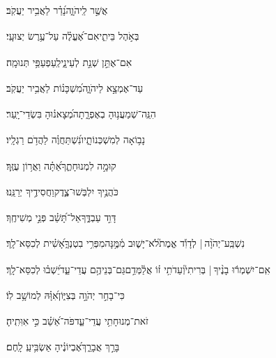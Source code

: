 \documentclass[12pt]{article}
\newcommand{\loc}[1]{\textsuperscript{\locf{#1}}}
\begin{document}
{\loc{ ב}~}‏אֲשֶׁ֣ר  לַֽיהֹוָ֑ה{\hfill}נָ֝דַ֗ר לַאֲבִ֥יר יַעֲקֹֽב׃\par

{\loc{ ג}~}‏ בְּאֹ֣הֶל בֵּיתִ֑י{\hfill}אִם־אֶ֝עֱלֶ֗ה עַל־עֶ֥רֶשׂ יְצוּעָֽי׃\par

{\loc{ ד}~}‏אִם־אֶתֵּ֣ן שְׁנַ֣ת לְעֵינָ֑י{\hfill}לְֽעַפְעַפַּ֥י תְּנוּמָֽה׃\par

{\loc{ ה}~}‏עַד־אֶמְצָ֣א  לַיהֹוָ֑ה{\hfill}מִ֝שְׁכָּנ֗וֹת לַאֲבִ֥יר יַעֲקֹֽב׃\par

{\loc{ ו}~}‏הִנֵּֽה־שְׁמַעֲנ֥וּהָ בְאֶפְרָ֑תָה{\hfill}מְ֝צָאנ֗וּהָ בִּשְׂדֵי־יָֽעַר׃\par

{\loc{ ז}~}‏נָב֥וֹאָה לְמִשְׁכְּנוֹתָ֑יו{\hfill}נִ֝שְׁתַּחֲוֶ֗ה לַהֲדֹ֥ם רַגְלָֽיו׃\par

{\loc{ ח}~}‏קוּמָ֣ה  לִמְנוּחָתֶ֑ךָ{\hfill}אַ֝תָּ֗ה וַאֲר֥וֹן עֻזֶּֽךָ׃\par

{\loc{ ט}~}‏כֹּהֲנֶ֥יךָ יִלְבְּשׁוּ־צֶ֑דֶק{\hfill}וַחֲסִידֶ֥יךָ יְרַנֵּֽנוּ׃\par

{\loc{ י}~}‏ דָּוִ֣ד עַבְדֶּ֑ךָ{\hfill}אַל־תָּ֝שֵׁ֗ב פְּנֵ֣י מְשִׁיחֶֽךָ׃\par

{\loc{ יא}~}‏נִשְׁבַּֽע־יְהֹוָ֨ה |  לְדָוִ֡ד אֱמֶת֮{\hfill}לֹא־יָשׁ֢וּב מִ֫מֶּ֥נָּה\newline\hspace*{.5em}מִפְּרִ֥י בִטְנְךָ֑{\hfill}אָ֝שִׁ֗ית לְכִסֵּא־לָֽךְ׃\par

{\loc{ יב}~}‏אִֽם־יִשְׁמְר֬וּ בָנֶ֨יךָ |  בְּרִיתִי֮{\hfill}וְעֵדֹתִ֥י ז֗וֹ אֲלַ֫מְּדֵ֥ם\newline\hspace*{.5em}גַּם־בְּנֵיהֶ֥ם עֲדֵי־עַ֑ד{\hfill}יֵ֝שְׁב֗וּ לְכִסֵּא־לָֽךְ׃\par

{\loc{ יג}~}‏כִּי־בָחַ֣ר יְהֹוָ֣ה בְּצִיּ֑וֹן{\hfill}אִ֝וָּ֗הּ לְמוֹשָׁ֥ב לֽוֹ׃\par

{\loc{ יד}~}‏זֹאת־מְנוּחָתִ֥י עֲדֵי־עַ֑ד{\hfill}פֹּה־אֵ֝שֵׁ֗ב כִּ֣י אִוִּתִֽיהָ׃\par

{\loc{ טו}~}‏ בָּרֵ֣ךְ אֲבָרֵ֑ךְ{\hfill}אֶ֝בְיוֹנֶ֗יהָ אַשְׂבִּ֥יעַֽ לָֽחֶם׃\par
\end{document}
